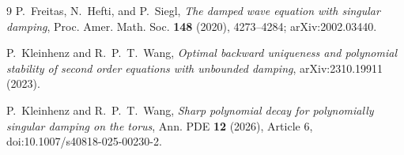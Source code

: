 \documentclass[11pt]{article}
\begin{document}
\begin{thebibliography}{9}
P.~Freitas, N.~Hefti, and P.~Siegl,
\emph{The damped wave equation with singular damping},
Proc. Amer. Math. Soc. \textbf{148} (2020), 4273--4284;
arXiv:2002.03440.

P.~Kleinhenz and R.~P.~T.~Wang,
\emph{Optimal backward uniqueness and polynomial stability of second order
equations with unbounded damping}, arXiv:2310.19911 (2023).

P.~Kleinhenz and R.~P.~T.~Wang,
\emph{Sharp polynomial decay for polynomially singular damping on the torus},
Ann. PDE \textbf{12} (2026), Article 6,
doi:10.1007/s40818-025-00230-2.
\end{thebibliography}
\end{document}
